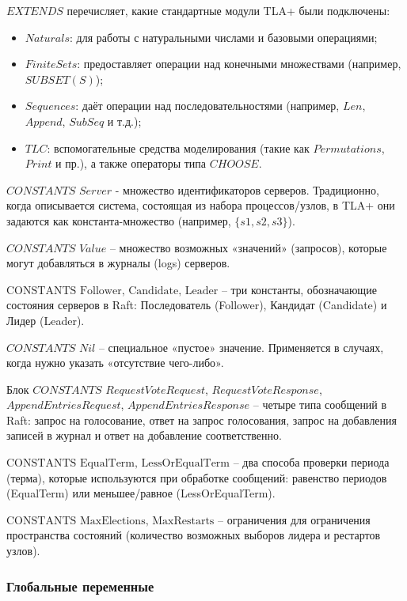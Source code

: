 $EXTENDS$ перечисляет, какие стандартные модули TLA+ были подключены:

\begin{itemize}
    \item $Naturals$: для работы с натуральными числами и базовыми операциями;
    \item $FiniteSets$: предоставляет операции над конечными множествами
        (например, $SUBSET(S)$);
    \item $Sequences$: даёт операции над последовательностями (например, $Len$,
        $Append$, $SubSeq$ и т.д.);
    \item $TLC$: вспомогательные средства моделирования (такие как $Permutations$,
        $Print$ и пр.), а также операторы типа $CHOOSE$.
\end{itemize}

$CONSTANTS$ $Server$ - множество идентификаторов серверов. Традиционно, когда
описывается система, состоящая из набора процессов/узлов, в TLA+ они задаются
как константа-множество (например, $\{s1, s2, s3\}$).

$CONSTANTS$ $Value$ – множество возможных «значений» (запросов), которые могут
добавляться в журналы (logs) серверов.

$\text{CONSTANTS Follower, Candidate, Leader}$ – три константы, обозначающие
состояния серверов в Raft: Последователь (Follower), Кандидат (Candidate)
и Лидер (Leader).

$CONSTANTS$ $Nil$ – специальное «пустое» значение. Применяется в случаях, когда
нужно указать «отсутствие чего-либо».

Блок ${CONSTANTS}$ $RequestVoteRequest$, $RequestVoteResponse$,
$AppendEntriesRequest$, $AppendEntriesResponse$ – четыре типа сообщений в Raft:
запрос на голосование, ответ на запрос голосования, запрос на добавления записей
в журнал и ответ на добавление соответственно.

$\text{CONSTANTS EqualTerm, LessOrEqualTerm}$ – два способа проверки периода (терма),
которые используются при обработке сообщений: равенство периодов (EqualTerm) или
меньшее/равное (LessOrEqualTerm).

$\text{CONSTANTS MaxElections, MaxRestarts}$ – ограничения для ограничения
пространства состояний (количество возможных выборов лидера и рестартов узлов).

\subsubsection*{Глобальные переменные}

